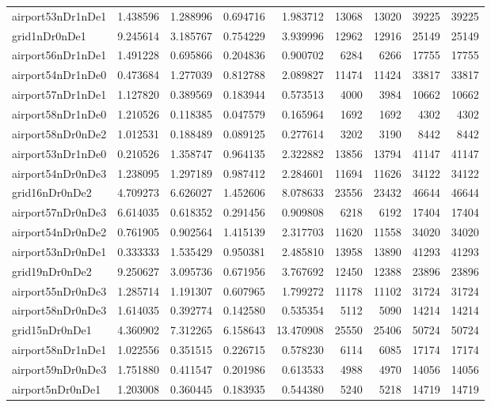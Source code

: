 \begin{longtable}{|l|r|r|r|r|r|r|r|r|}
airport53nDr1nDe1 & 1.438596 & 1.288996 & 0.694716 & 1.983712 & 13068 & 13020 & 39225 & 39225 \\
grid1nDr0nDe1 & 9.245614 & 3.185767 & 0.754229 & 3.939996 & 12962 & 12916 & 25149 & 25149 \\
airport56nDr1nDe1 & 1.491228 & 0.695866 & 0.204836 & 0.900702 & 6284 & 6266 & 17755 & 17755 \\
airport54nDr1nDe0 & 0.473684 & 1.277039 & 0.812788 & 2.089827 & 11474 & 11424 & 33817 & 33817 \\
airport57nDr1nDe1 & 1.127820 & 0.389569 & 0.183944 & 0.573513 & 4000 & 3984 & 10662 & 10662 \\
airport58nDr1nDe0 & 1.210526 & 0.118385 & 0.047579 & 0.165964 & 1692 & 1692 & 4302 & 4302 \\
airport58nDr0nDe2 & 1.012531 & 0.188489 & 0.089125 & 0.277614 & 3202 & 3190 & 8442 & 8442 \\
airport53nDr1nDe0 & 0.210526 & 1.358747 & 0.964135 & 2.322882 & 13856 & 13794 & 41147 & 41147 \\
airport54nDr0nDe3 & 1.238095 & 1.297189 & 0.987412 & 2.284601 & 11694 & 11626 & 34122 & 34122 \\
grid16nDr0nDe2 & 4.709273 & 6.626027 & 1.452606 & 8.078633 & 23556 & 23432 & 46644 & 46644 \\
airport57nDr0nDe3 & 6.614035 & 0.618352 & 0.291456 & 0.909808 & 6218 & 6192 & 17404 & 17404 \\
airport54nDr0nDe2 & 0.761905 & 0.902564 & 1.415139 & 2.317703 & 11620 & 11558 & 34020 & 34020 \\
airport53nDr0nDe1 & 0.333333 & 1.535429 & 0.950381 & 2.485810 & 13958 & 13890 & 41293 & 41293 \\
grid19nDr0nDe2 & 9.250627 & 3.095736 & 0.671956 & 3.767692 & 12450 & 12388 & 23896 & 23896 \\
airport55nDr0nDe3 & 1.285714 & 1.191307 & 0.607965 & 1.799272 & 11178 & 11102 & 31724 & 31724 \\
airport58nDr0nDe3 & 1.614035 & 0.392774 & 0.142580 & 0.535354 & 5112 & 5090 & 14214 & 14214 \\
grid15nDr0nDe1 & 4.360902 & 7.312265 & 6.158643 & 13.470908 & 25550 & 25406 & 50724 & 50724 \\
airport58nDr1nDe1 & 1.022556 & 0.351515 & 0.226715 & 0.578230 & 6114 & 6085 & 17174 & 17174 \\
airport59nDr0nDe3 & 1.751880 & 0.411547 & 0.201986 & 0.613533 & 4988 & 4970 & 14056 & 14056 \\
airport5nDr0nDe1 & 1.203008 & 0.360445 & 0.183935 & 0.544380 & 5240 & 5218 & 14719 & 14719 \\

\end{longtable}
